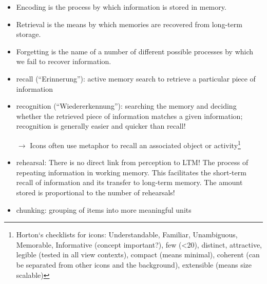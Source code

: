 \begin{itemize}
\item Encoding is the process by which information is stored in memory.
\item Retrieval is the means by which memories are recovered from long-term storage.
\item Forgetting is the name of a number of different possible processes by which we fail to recover information.
\item recall (``Erinnerung''): active memory search to retrieve a particular piece of information
\item recognition (``Wiedererkennung''): searching the memory and deciding whether the retrieved piece of information matches a given information; recognition is generally easier and quicker than recall!
\item[$\rightarrow$] Icons often use metaphor to recall an associated object or activity\footnote{Horton‘s checklists for icons: Understandable, Familiar, Unambiguous, Memorable, Informative (concept important?), few (<20), distinct, attractive, legible (tested in all view contexts), compact (means minimal), coherent (can be separated from other icons and the background), extensible (means size scalable)}
\item rehearsal: There is no direct link from perception to LTM! The process of repeating information in working memory. This facilitates the short-term recall of information and its transfer to long-term memory. The amount stored is proportional to the number of rehearsals!
\item chunking: grouping of items into more meaningful units
\end{itemize}

